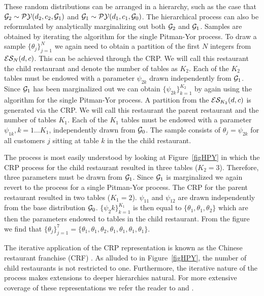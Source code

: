 These random distributions can be arranged in a hierarchy, such as the case that $\G_2 \sim \PY(d_2, c_2, \G_1)$ and $\G_1 \sim \PY(d_1, c_1, \G_0)$.  The hierarchical process can also be reformulated by analytically marginalizing out both $\G_2$ and $\G_1$.  Samples are obtained by iterating the algorithm for the single Pitman-Yor process.  To draw a sample $\{ \theta_j \}_{j = 1}^N$ we again need to obtain a partition of the first $N$ integers from $\ES_N(d,c)$.  This can be achieved through the CRP.  We will call this restaurant the child restaurant and denote the number of tables as $K_2$.  Each of the $K_2$ tables must be endowed with a parameter $ \psi_{2k}$ drawn independently from $\G_1$.  Since $\G_1$ has been marginalized out we can obtain $\{ \psi_{2k} \}_ {k = 1}^{K_2}$ by again using the algorithm for the single Pitman-Yor process.  A partition from the $\ES_{K_2}(d,c)$ is generated via the CRP.  We will call this restaurant the parent restaurant and the number of tables $K_1$.   Each of the $K_1$ tables must be endowed with a parameter $\psi_{1k}, k = 1 \ldots K_1$,  independently drawn from $\G_0$.  The sample consists of $\theta_j =\psi_{2k}$ for all customers $j$ sitting at table $k$ in the the child restaurant.

The process is most easily understood by looking at Figure~\ref{figHPY} in which the CRP process for the child restaurant resulted in three tables ($K_2 = 3$).  Therefore, three parameters must be drawn from $\G_1$.  Since $\G_1$ is marginalized we again revert to the process for a single Pitman-Yor process. The CRP for the parent restaurant resulted in two tables ($K_1 = 2$).  $\psi_{11}$ and $\psi_{12}$ are drawn independently from the base distribution $\G_0$.  $\{ \psi_2k \}_{k = 1}^{K_1}$ is then equal to $\{ \theta_1, \theta_1, \theta_2 \}$ which are then the parameters endowed to tables in the child restaurant.  From the figure we find that  $\{ \theta_j \}_{j = 1}^7 = \{ \theta_1, \theta_1, \theta_2, \theta_1, \theta_1, \theta_1, \theta_1 \}$.

The iterative application of the CRP representation is known as the Chinese restaurant franchise (CRF) \cite{teh hdp paper}.  As alluded to in Figure~\ref{figHPY}, the number of child restaurants is not restricted to one.  Furthermore, the iterative nature of the process makes extensions to deeper hierarchies natural.  For more extensive coverage of these representations we refer the reader to \cite{teh hpp} and \cite{teh hpy for langmodel}.

